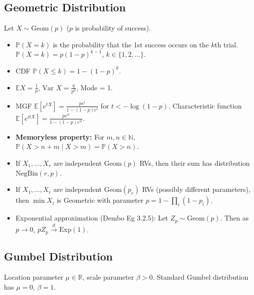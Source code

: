 \documentclass[twoside]{article}
\newcommand\bbE{\mathbb{E}}
\newcommand\bbN{\mathbb{N}}
\newcommand\bbP{\mathbb{P}}
\newcommand\bbR{\mathbb{R}}
\newcommand\goesto{\rightarrow}
\newcommand\var{\text{Var }}
\begin{document}
\subsection{Geometric Distribution}
Let $X \sim \text{Geom}(p)$ ($p$ is probability of success).
\begin{itemize}
\item $\bbP(X = k)$ is the probability that the 1st success occurs on the $k$th trial. $\bbP(X = k) = p (1-p)^{k-1}$, $k \in \{1, 2, \dots \}$.

\item CDF $\bbP(X \leq k) = 1 - (1-p)^k$.

\item $\bbE X = \displaystyle\frac{1}{p}$, $\var X = \displaystyle\frac{q}{p^2}$, Mode = 1.

\item MGF $\bbE [e^{tX}] = \displaystyle\frac{pe^t}{1 - (1-p)e^t}$ for $t < - \log (1-p)$. Characteristic function $\bbE [e^{itX}] = \displaystyle\frac{pe^{it}}{1 - (1-p)e^{it}}$.

\item \textbf{Memoryless property:} For $m, n \in \bbN$, $\bbP (X > n + m \mid X > m) = \bbP (X > n)$.

\item If $X_1, \dots, X_r$ are independent $\text{Geom}(p)$ RVs, then their sum has distribution $\text{NegBin}(r, p)$.

\item If $X_1, \dots, X_r$ are independent $\text{Geom}(p_r)$ RVs (possibly different parameters), then $\min X_i$ is Geometric with parameter $p = 1 - \displaystyle\prod_i (1-p_i)$.

\item Exponential approximation (Dembo Eg 3.2.5): Let $Z_p \sim \text{Geom}(p)$. Then as $p \goesto 0$, $p Z_p \stackrel{d}{\goesto} \text{Exp}(1)$.

\end{itemize}

\subsection{Gumbel Distribution}
Location parameter $\mu \in \bbR$, scale parameter $\beta > 0$. Standard Gumbel distribution has $\mu = 0$, $\beta = 1$.
\end{document}
